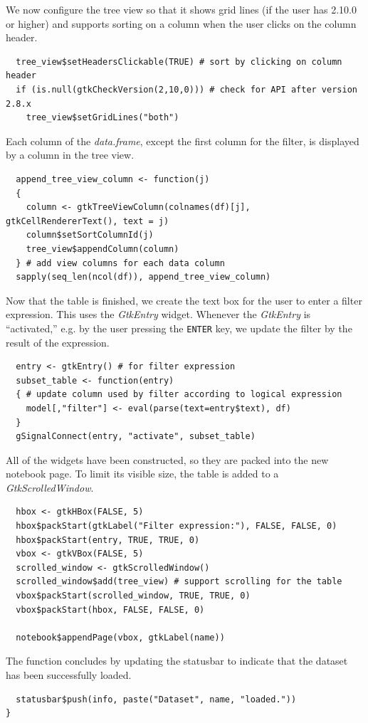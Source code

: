 \documentclass[article]{jss}
\begin{document}
We now configure the tree view so that it shows grid lines (if the user
has  2.10.0 or higher) and supports sorting on a column when
the user clicks on the column header.
\begin{verbatim}
  tree_view$setHeadersClickable(TRUE) # sort by clicking on column header
  if (is.null(gtkCheckVersion(2,10,0))) # check for API after version 2.8.x
    tree_view$setGridLines("both")
\end{verbatim}
Each column of the \emph{data.frame}, except the first column for the filter,
is displayed by a column in the tree view.
\begin{verbatim}
  append_tree_view_column <- function(j)
  {
    column <- gtkTreeViewColumn(colnames(df)[j], gtkCellRendererText(), text = j)
    column$setSortColumnId(j)
    tree_view$appendColumn(column)
  } # add view columns for each data column
  sapply(seq_len(ncol(df)), append_tree_view_column)
\end{verbatim}
Now that the table is finished, we create the text box for the user to enter
a filter expression. This uses the \emph{GtkEntry} widget. Whenever the
\emph{GtkEntry} is ``activated,'' e.g. by the user pressing the \texttt{ENTER}
key, we update the filter by the result of the  expression.
\begin{verbatim}
  entry <- gtkEntry() # for filter expression
  subset_table <- function(entry)
  { # update column used by filter according to logical expression
    model[,"filter"] <- eval(parse(text=entry$text), df)
  }
  gSignalConnect(entry, "activate", subset_table)
\end{verbatim}
All of the widgets have been constructed, so they are packed into the new notebook page.
To limit its visible size, the table is added to a \emph{GtkScrolledWindow}.
\begin{verbatim}
  hbox <- gtkHBox(FALSE, 5)
  hbox$packStart(gtkLabel("Filter expression:"), FALSE, FALSE, 0)
  hbox$packStart(entry, TRUE, TRUE, 0)
  vbox <- gtkVBox(FALSE, 5)
  scrolled_window <- gtkScrolledWindow()
  scrolled_window$add(tree_view) # support scrolling for the table
  vbox$packStart(scrolled_window, TRUE, TRUE, 0)
  vbox$packStart(hbox, FALSE, FALSE, 0)
  
  notebook$appendPage(vbox, gtkLabel(name))
\end{verbatim}
The function concludes by updating the statusbar to indicate that the dataset
has been successfully loaded.
\begin{verbatim}
  statusbar$push(info, paste("Dataset", name, "loaded."))
}
\end{verbatim}
\end{document}
